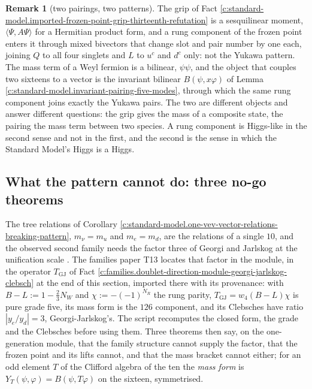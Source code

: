 \documentclass[11pt]{article}
\theoremstyle{definition}
\newtheorem{remark}[theorem]{Remark}
\theoremstyle{plain}
\providecommand{\ip}{}\renewcommand{\ip}[2]{\langle #1, #2\rangle}
\begin{document}
\begin{remark}[two pairings, two patterns]\label{c:note.standard-model.two-pairings-two-patterns}
The grip of Fact \ref{c:standard-model.imported-frozen-point-grip-thirteenth-refutation} is a sesquilinear moment, $\ip{\Psi}{A\Psi}$ for a Hermitian product form, and a rung component of the frozen point enters it through mixed bivectors that change slot and pair number by one each, joining $Q$ to all four singlets and $L$ to $u^{c}$ and $d^{c}$ only: not the Yukawa pattern. The mass term of a Weyl fermion is a bilinear, $\psi\psi$, and the object that couples two sixteens to a vector is the invariant bilinear $B(\psi, x\varphi)$ of Lemma \ref{c:standard-model.invariant-pairing-five-modes}, through which the same rung component joins exactly the Yukawa pairs. The two are different objects and answer different questions: the grip gives the mass of a composite state, the pairing the mass term between two species. A rung component is Higgs-like in the second sense and not in the first, and the second is the sense in which the Standard Model's Higgs is a Higgs.
\end{remark}

\subsection*{What the pattern cannot do: three no-go theorems}
\label{c:note.standard-model.setting-what-pattern-cannot-do-three}
The tree relations of Corollary \ref{c:standard-model.one-vev-vector-relations-breaking-pattern}, $m_{\nu} = m_{u}$ and $m_{e} = m_{d}$, are the relations of a single $10$, and the observed second family needs the factor three of Georgi and Jarlskog at the unification scale \cite{GeorgiJarlskog1979}. The families paper T13 \cite{ButlerT13} locates that factor in the module, in the operator $T_{\mathrm{GJ}}$ of Fact \ref{c:families.doublet-direction-module-georgi-jarlskog-clebsch} at the end of this section, imported there with its provenance: with $B - L := 1 - \tfrac23 N_{W}$ and $\chi := -(-1)^{N_{R}}$ the rung parity, $T_{\mathrm{GJ}} = w_{4}(B - L)\chi$ is pure grade five, its mass form is the $126$ component, and its Clebsches have ratio $|y_{e}/y_{d}| = 3$, Georgi-Jarlskog's. The script recomputes the closed form, the grade and the Clebsches before using them. Three theorems then say, on the one-generation module, that the family structure cannot supply the factor, that the frozen point and its lifts cannot, and that the mass bracket cannot either; for an odd element $T$ of the Clifford algebra of the ten the \emph{mass form} is $Y_{T}(\psi, \varphi) = B(\psi, T\varphi)$ on the sixteen, symmetrised.
\end{document}

